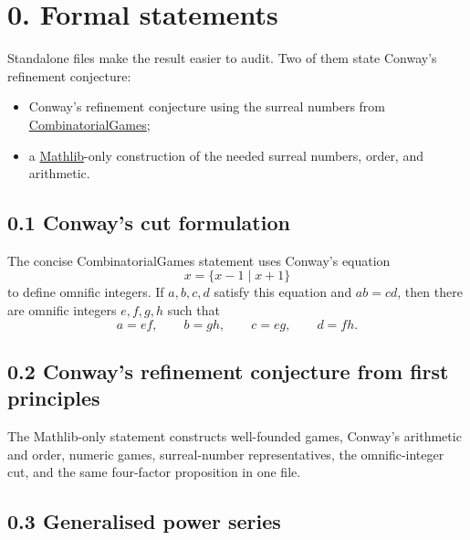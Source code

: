\section*{0. Formal statements}

Standalone files make the result easier to audit.  Two of them state Conway's refinement
conjecture:
\begin{itemize}
  \item Conway's refinement conjecture using the surreal numbers from
    \href{https://github.com/vihdzp/combinatorial-games}{CombinatorialGames};
  \item a \href{https://github.com/leanprover-community/mathlib4}{Mathlib}-only construction of the
    needed surreal numbers, order, and arithmetic.
\end{itemize}

\subsection*{0.1 Conway's cut formulation}

The concise
  {CombinatorialGames statement}
uses Conway's equation
\[
  x=\{x-1\mid x+1\}
\]
to define omnific integers.  If $a,b,c,d$ satisfy this equation and $ab=cd$, then there are
omnific integers $e,f,g,h$ such that
\[
  a=ef,\qquad b=gh,\qquad c=eg,\qquad d=fh.
\]

\subsection*{0.2 Conway's refinement conjecture from first principles}

The
  {Mathlib-only statement}
constructs well-founded games, Conway's arithmetic and order, numeric games, surreal-number
representatives, the omnific-integer cut, and the same four-factor proposition in one file.

\subsection*{0.3 Generalised power series}


